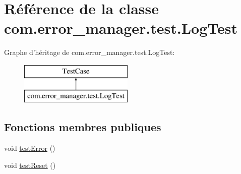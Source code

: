 \hypertarget{classcom_1_1error__manager_1_1test_1_1LogTest}{\section{Référence de la classe com.\-error\-\_\-manager.\-test.\-Log\-Test}
\label{classcom_1_1error__manager_1_1test_1_1LogTest}
}
Graphe d'héritage de com.\-error\-\_\-manager.\-test.\-Log\-Test\-:\begin{figure}[H]
\begin{center}
\leavevmode
\includegraphics[height=2.000000cm]{d2/d45/classcom_1_1error__manager_1_1test_1_1LogTest}
\end{center}
\end{figure}
\subsection*{Fonctions membres publiques}
\begin{DoxyCompactItemize}
\item 
void \hyperlink{classcom_1_1error__manager_1_1test_1_1LogTest_a8a5ab3454826acbf2a7aa8bde0e66702}{test\-Error} ()
\item 
void \hyperlink{classcom_1_1error__manager_1_1test_1_1LogTest_a948eff44525b535e905756c1b66008c7}{test\-Reset} ()
\end{DoxyCompactItemize}


